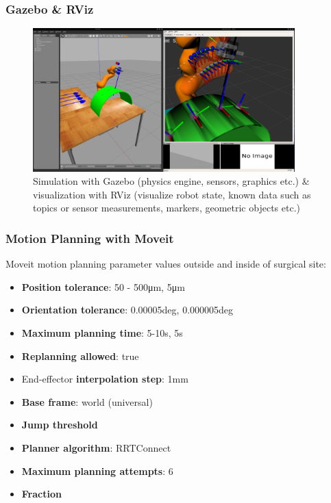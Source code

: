 \begin{frame}
\frametitle{Gazebo \& RViz}
\begin{center}
\begin{figure}[!htb]
\centering
\includegraphics[width=0.9\textwidth]{../images/gazebo-rviz.png}
\caption{Simulation with Gazebo (physics engine, sensors, graphics etc.) \& visualization with RViz (visualize robot state, known data such as topics or sensor measurements, markers, geometric objects etc.)}
\end{figure}
\end{center}
\end{frame}

\begin{frame}
\frametitle{Motion Planning with Moveit}
Moveit motion planning parameter values outside and inside of surgical site:
\begin{itemize}
	\item \textbf{Position tolerance}: 50 - 500μm, 5μm
	\item \textbf{Orientation tolerance}: 0.00005deg, 0.000005deg
	\item \textbf{Maximum planning time}: 5-10s, 5s
	\item \textbf{Replanning allowed}: true
	\item End-effector \textbf{interpolation step}: 1mm
	\item \textbf{Base frame}: world (universal)
	\item \textbf{Jump threshold}
	\item \textbf{Planner algorithm}: RRTConnect
	\item \textbf{Maximum planning attempts}: 6
	\item \textbf{Fraction}
\end{itemize}
\end{frame}

